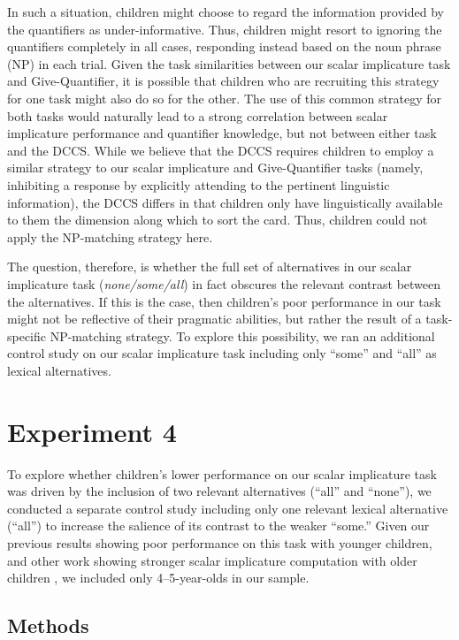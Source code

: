 \documentclass[man]{apa2}
\begin{document}
In such a situation, children might choose to regard the information provided by the quantifiers as under-informative. Thus, children might resort to ignoring the quantifiers completely in all cases, responding instead based on the noun phrase (NP) in each trial. Given the task similarities between our scalar implicature task and Give-Quantifier, it is possible that children who are recruiting this strategy for one task might also do so for the other. The use of this common strategy for both tasks would naturally lead to a strong correlation between scalar implicature performance and quantifier knowledge, but not between either task and the DCCS. While we believe that the DCCS requires children to employ a similar strategy to our scalar implicature and Give-Quantifier tasks (namely, inhibiting a response by explicitly attending to the pertinent linguistic information), the DCCS differs in that children only have linguistically available to them the dimension along which to sort the card. Thus, children could not apply the NP-matching strategy here.

The question, therefore, is whether the full set of alternatives in our scalar implicature task (\emph{none/some/all}) in fact obscures the relevant contrast between the alternatives. If this is the case, then children's poor performance in our task might not be reflective of their pragmatic abilities, but rather the result of a task-specific NP-matching strategy. To explore this possibility, we ran an additional control study on our scalar implicature task including only ``some'' and ``all'' as lexical alternatives.

\section{Experiment 4}

To explore whether children's lower performance on our scalar implicature task was driven by the inclusion of two relevant alternatives (``all'' and ``none''), we conducted a separate control study including only one relevant lexical alternative (``all'') to increase the salience of its contrast to the weaker ``some.'' Given our previous results showing poor performance on this task with younger children, and other work showing stronger scalar implicature computation with older children \cite{skordos2016}, we included only 4--5-year-olds in our sample.

\subsection{Methods}
\end{document}
